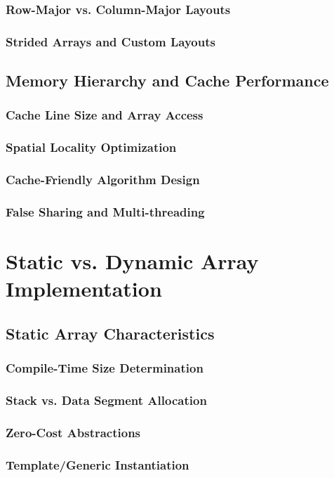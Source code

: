 \documentclass[12pt, oneside]{book}
\begin{document}
\subsubsection{Row-Major vs. Column-Major Layouts}
\subsubsection{Strided Arrays and Custom Layouts}

\subsection{Memory Hierarchy and Cache Performance}
\subsubsection{Cache Line Size and Array Access}
\subsubsection{Spatial Locality Optimization}
\subsubsection{Cache-Friendly Algorithm Design}
\subsubsection{False Sharing and Multi-threading}

\section{Static vs. Dynamic Array Implementation}
\subsection{Static Array Characteristics}
\subsubsection{Compile-Time Size Determination}
\subsubsection{Stack vs. Data Segment Allocation}
\subsubsection{Zero-Cost Abstractions}
\subsubsection{Template/Generic Instantiation}
\end{document}
